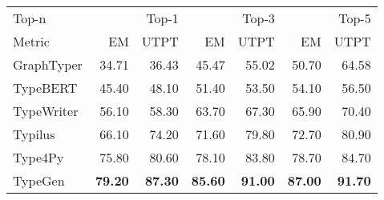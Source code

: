 \begin{tabular}{lrrrrrr}
\toprule
Top-n & \multicolumn{2}{r}{Top-1} & \multicolumn{2}{r}{Top-3} & \multicolumn{2}{r}{Top-5} \\
Metric & EM & UTPT & EM & UTPT & EM & UTPT \\
\midrule
GraphTyper & 34.71 & 36.43 & 45.47 & 55.02 & 50.70 & 64.58 \\
\cline{1-7}
TypeBERT & 45.40 & 48.10 & 51.40 & 53.50 & 54.10 & 56.50 \\
TypeWriter & 56.10 & 58.30 & 63.70 & 67.30 & 65.90 & 70.40 \\
Typilus & 66.10 & 74.20 & 71.60 & 79.80 & 72.70 & 80.90 \\
Type4Py & 75.80 & 80.60 & 78.10 & 83.80 & 78.70 & 84.70 \\
TypeGen & \bfseries 79.20 & \bfseries 87.30 & \bfseries 85.60 & \bfseries 91.00 & \bfseries 87.00 & \bfseries 91.70 \\
\bottomrule
\end{tabular}

